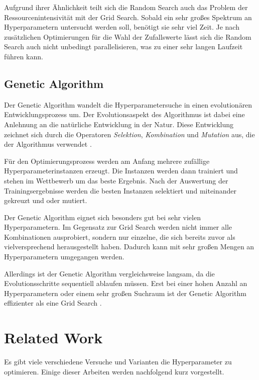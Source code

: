 Aufgrund ihrer Ähnlichkeit teilt sich die Random Search auch das Problem der Ressourcenintensivität mit der Grid Search.
Sobald ein sehr großes Spektrum an Hyperparametern untersucht werden soll, benötigt sie sehr viel Zeit.
Je nach zusätzlichen Optimierungen für die Wahl der Zufallswerte lässt sich die Random Search auch nicht unbedingt parallelisieren, was zu einer sehr langen Laufzeit führen kann.

\subsection{Genetic Algorithm}
Der Genetic Algorithm wandelt die Hyperparametersuche in einen evolutionären Entwicklungsprozess um.
Der Evolutionsaspekt des Algorithmus ist dabei eine Anlehnung an die natürliche Entwicklung in der Natur.
Diese Entwicklung zeichnet sich durch die Operatoren \textit{Selektion}, \textit{Kombination} und \textit{Mutation} aus, die der Algorithmus verwendet \cite{hyperparameters-genetic-algorithm}.
\newline

Für den Optimierungsprozess werden am Anfang mehrere zufällige Hyperparameterinstanzen erzeugt.
Die Instanzen werden dann trainiert und stehen im Wettbewerb um das beste Ergebnis.
Nach der Auswertung der Trainingsergebnisse werden die besten Instanzen selektiert und miteinander gekreuzt und oder mutiert.
\newline

Der Genetic Algorithm eignet sich besonders gut bei sehr vielen Hyperparametern.
Im Gegensatz zur Grid Search werden nicht immer alle Kombinationen ausprobiert, sondern nur einzelne, die sich bereits zuvor als vielversprechend herausgestellt haben.
Dadurch kann mit sehr großen Mengen an Hyperparametern umgegangen werden.

Allerdings ist der Genetic Algorithm vergleichsweise langsam, da die Evolutionsschritte sequentiell ablaufen müssen.
Erst bei einer hohen Anzahl an Hyperparametern oder einem sehr großen Suchraum ist der Genetic Algorithm effizienter als eine Grid Search \cite{hyperparameters-search-comparison-focus-genetic}.

\section{Related Work}
\label{chapter:related-work}
Es gibt viele verschiedene Versuche und Varianten die Hyperparameter zu optimieren.
Einige dieser Arbeiten werden nachfolgend kurz vorgestellt.
\newline

